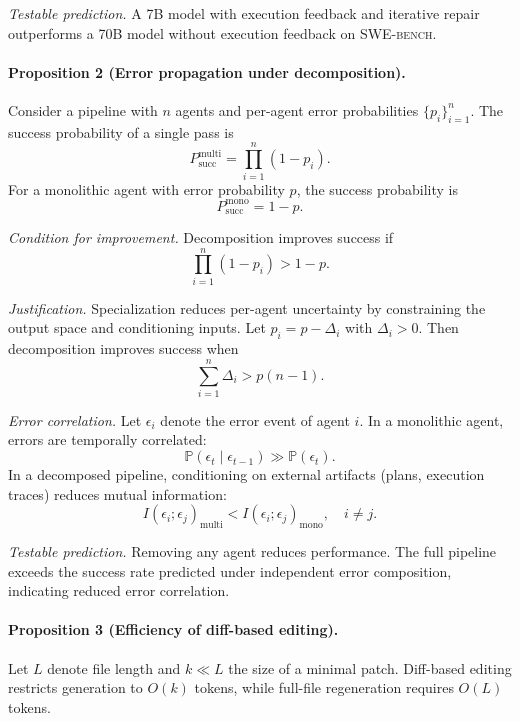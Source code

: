 \documentclass[journal]{IEEEtran}
\newcommand{\swebench}{\textsc{SWE-bench}}
\begin{document}
\textit{Testable prediction.}
A 7B model with execution feedback and iterative repair outperforms a 70B model without execution feedback on \swebench{}.

\paragraph{Proposition 2 (Error propagation under decomposition).}
Consider a pipeline with $n$ agents and per-agent error probabilities $\{p_i\}_{i=1}^n$. The success probability of a single pass is
\begin{equation}
P_{\text{succ}}^{\text{multi}} = \prod_{i=1}^{n} (1 - p_i).
\end{equation}
For a monolithic agent with error probability $p$, the success probability is
\begin{equation}
P_{\text{succ}}^{\text{mono}} = 1 - p.
\end{equation}

\textit{Condition for improvement.}
Decomposition improves success if
\begin{equation}
\prod_{i=1}^{n} (1 - p_i) > 1 - p.
\end{equation}

\textit{Justification.}
Specialization reduces per-agent uncertainty by constraining the output space and conditioning inputs. Let $p_i = p - \Delta_i$ with $\Delta_i > 0$. Then decomposition improves success when
\begin{equation}
\sum_{i=1}^{n} \Delta_i > p (n - 1).
\end{equation}

\textit{Error correlation.}
Let $\epsilon_i$ denote the error event of agent $i$. In a monolithic agent, errors are temporally correlated:
\begin{equation}
\mathbb{P}(\epsilon_t \mid \epsilon_{t-1}) \gg \mathbb{P}(\epsilon_t).
\end{equation}
In a decomposed pipeline, conditioning on external artifacts (plans, execution traces) reduces mutual information:
\begin{equation}
I(\epsilon_i; \epsilon_j)_{\text{multi}} < I(\epsilon_i; \epsilon_j)_{\text{mono}}, \quad i \neq j.
\end{equation}

\textit{Testable prediction.}
Removing any agent reduces performance. The full pipeline exceeds the success rate predicted under independent error composition, indicating reduced error correlation.

\paragraph{Proposition 3 (Efficiency of diff-based editing).}
Let $L$ denote file length and $k \ll L$ the size of a minimal patch. Diff-based editing restricts generation to $O(k)$ tokens, while full-file regeneration requires $O(L)$ tokens.
\end{document}
